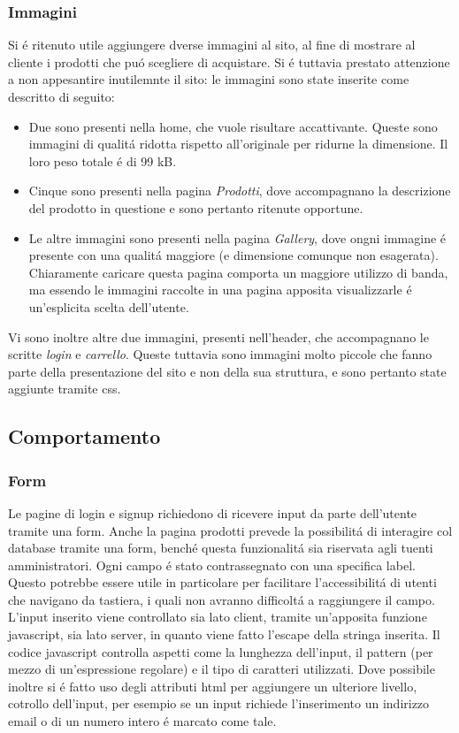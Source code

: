 		\subsubsection{Immagini}
			Si \'e ritenuto utile aggiungere dverse immagini al sito, al fine di mostrare al cliente i prodotti che pu\'o scegliere di acquistare.
			Si \'e tuttavia prestato attenzione a non appesantire inutilemnte il sito: le immagini sono state inserite come descritto di seguito:
			\begin{itemize}
			\item Due sono presenti nella home, che vuole risultare accattivante. Queste sono immagini di qualit\'a ridotta rispetto all'originale per ridurne la dimensione. Il loro peso totale \'e di 99 kB.
			\item Cinque sono presenti nella pagina \emph{Prodotti}, dove accompagnano la descrizione del prodotto in questione e sono pertanto ritenute opportune.
			\item Le altre immagini sono presenti nella pagina \emph{Gallery}, dove ongni immagine \'e presente con una qualit\'a maggiore (e dimensione comunque non esagerata). Chiaramente caricare questa pagina comporta un maggiore utilizzo di banda, ma essendo le immagini raccolte in una pagina apposita visualizzarle \'e un'esplicita scelta dell'utente.
			\end{itemize}
			Vi sono inoltre altre due immagini, presenti nell'header, che accompagnano le scritte \emph{login} e \emph{carrello}.
			Queste tuttavia sono immagini molto piccole che fanno parte della presentazione del sito e non della sua struttura, e sono pertanto state aggiunte tramite css.


    \subsection{Comportamento}
		\subsubsection{Form}
		Le pagine di login e signup richiedono di ricevere input da parte dell'utente tramite una form.
		Anche la pagina prodotti prevede la possibilit\'a di interagire col database tramite una form, bench\'e questa funzionalit\'a sia riservata agli tuenti amministratori.
		Ogni campo \'e stato contrassegnato con una specifica label.
		Questo potrebbe essere utile in particolare per facilitare l'accessibilit\'a di utenti che navigano da tastiera, i quali non avranno difficolt\'a  a raggiungere il campo.
		L'input inserito viene controllato sia lato client, tramite un'apposita funzione javascript, sia lato server, in quanto viene fatto l'escape della stringa inserita.
		Il codice javascript controlla aspetti come la lunghezza dell'input, il pattern (per mezzo di un'espressione regolare) e il tipo di caratteri utilizzati.
		Dove possibile inoltre si \'e fatto uso degli attributi html per aggiungere un ulteriore livello, cotrollo dell'input, per esempio se un input richiede l'inserimento un indirizzo email o di un numero intero \'e marcato come tale.

